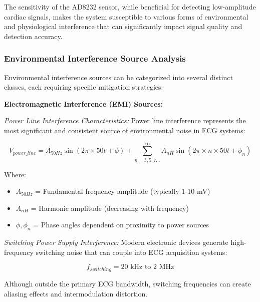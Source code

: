 \documentclass[12pt,a4paper]{article}
\begin{document}
\vspace{0.5cm}

The sensitivity of the AD8232 sensor, while beneficial for detecting low-amplitude cardiac signals, makes the system susceptible to various forms of environmental and physiological interference that can significantly impact signal quality and detection accuracy.

\subsubsection{Environmental Interference Source Analysis}

Environmental interference sources can be categorized into several distinct classes, each requiring specific mitigation strategies:

\vspace{0.5cm}

\textbf{Electromagnetic Interference (EMI) Sources:}

\textit{Power Line Interference Characteristics:}
Power line interference represents the most significant and consistent source of environmental noise in ECG systems:

\begin{equation*}
V_{power\_line} = A_{50Hz} \sin(2\pi \times 50t + \phi) + \sum_{n=3,5,7...}^{\infty} A_{nH} \sin(2\pi \times n \times 50t + \phi_n)
\end{equation*}

Where:
\begin{itemize}
\item $A_{50Hz}$ = Fundamental frequency amplitude (typically 1-10 mV)
\item $A_{nH}$ = Harmonic amplitude (decreasing with frequency)
\item $\phi, \phi_n$ = Phase angles dependent on proximity to power sources
\end{itemize}

\textit{Switching Power Supply Interference:}
Modern electronic devices generate high-frequency switching noise that can couple into ECG acquisition systems:

\begin{equation*}
f_{switching} = 20 \text{ kHz to } 2 \text{ MHz}
\end{equation*}

Although outside the primary ECG bandwidth, switching frequencies can create aliasing effects and intermodulation distortion.

\vspace{0.3cm}
\end{document}
